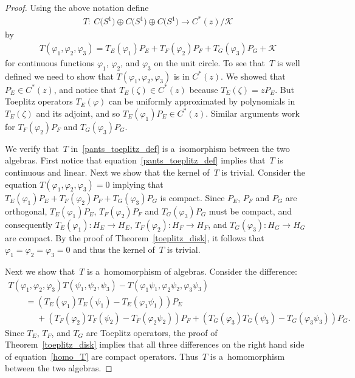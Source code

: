 \documentclass[11pt]{article}
\numberwithin{equation}{section}
\begin{document}
\begin{proof}
Using the above notation def\/ine
\begin{gather*}
T: \  C\big(S^1\big)\oplus C\big(S^1\big)\oplus C\big(S^1\big) \to C^*(z)/\mathcal{K}
\end{gather*}
by
\begin{gather}
\label{pants_toeplitz_def}
T(\varphi_1,\varphi_2,\varphi_3)=T_E(\varphi_1)P_E+T_F(\varphi_2)P_F+T_G(\varphi_3)P_G+\mathcal{K}
\end{gather}
for continuous functions $\varphi_1$, $\varphi_2$, and $\varphi_3$ on the unit circle.
To see that~$T$ is well def\/ined we need to show that $T(\varphi_1,\varphi_2,\varphi_3)$ is in $C^*(z)$.
We showed that $P_E\in C^*(z)$, and notice that $T_E(\zeta)\in C^*(z)$ because $T_E(\zeta)=zP_E$.
But Toeplitz operators $T_E(\varphi)$ can be uniformly approximated by polynomials in $T_E(\zeta)$ and its adjoint, and
so $T_E(\varphi_1)P_E\in C^*(z)$.
Similar arguments work for $T_F(\varphi_2)P_F$ and $T_G(\varphi_3)P_G$.

We verify that~$T$ in~\eqref{pants_toeplitz_def} is a~isomorphism between the two algebras.
First notice that equation~\eqref{pants_toeplitz_def} implies that~$T$ is continuous and linear.
Next we show that the kernel of~$T$ is trivial.
Consider the equation $T(\varphi_1,\varphi_2,\varphi_3)=0$ implying that $T_E(\varphi_1)P_E+T_F(\varphi_2)P_F+T_G(\varphi_3)P_G$ is compact.
Since $P_E$, $P_F$ and $P_G$ are orthogonal, $T_E(\varphi_1)P_E$, $T_F(\varphi_2)P_F$ and $T_G(\varphi_3)P_G$ must be
compact, and consequently $T_E(\varphi_1):H_E \to H_E$, $T_F(\varphi_2):H_F \to H_F$, and $T_G(\varphi_3):H_G \to H_G$
are compact.
By the proof of Theorem~\ref{toeplitz_disk}, it follows that $\varphi_1=\varphi_2=\varphi_3=0$ and thus the kernel
of~$T$ is trivial.

Next we show that~$T$ is a~homomorphism of algebras.
Consider the dif\/ference:
\begin{gather}
T(\varphi_1,\varphi_2,\varphi_3)T(\psi_1,\psi_2,\psi_3)-T(\varphi_1\psi_1,\varphi_2\psi_2,\varphi_3\psi_3)
\nonumber
\\
\qquad{}
=\left(T_E(\varphi_1)T_E(\psi_1)-T_E(\varphi_1\psi_1)\right)P_E
\nonumber
\\
\qquad
\phantom{=}{}
+\left(T_F(\varphi_2)T_F(\psi_2)-T_F(\varphi_2\psi_2)\right)P_F+\left(T_G(\varphi_3)T_G(\psi_3)-T_G(\varphi_3\psi_3)\right)P_G.
\label{homo_T}
\end{gather}
Since $T_E$, $T_F$, and $T_G$ are Toeplitz operators, the proof of Theorem~\ref{toeplitz_disk} implies that all three
dif\/ferences on the right hand side of equation~\eqref{homo_T} are compact operators.
Thus~$T$ is a~homomorphism between the two algebras.


\end{proof}
\end{document}
